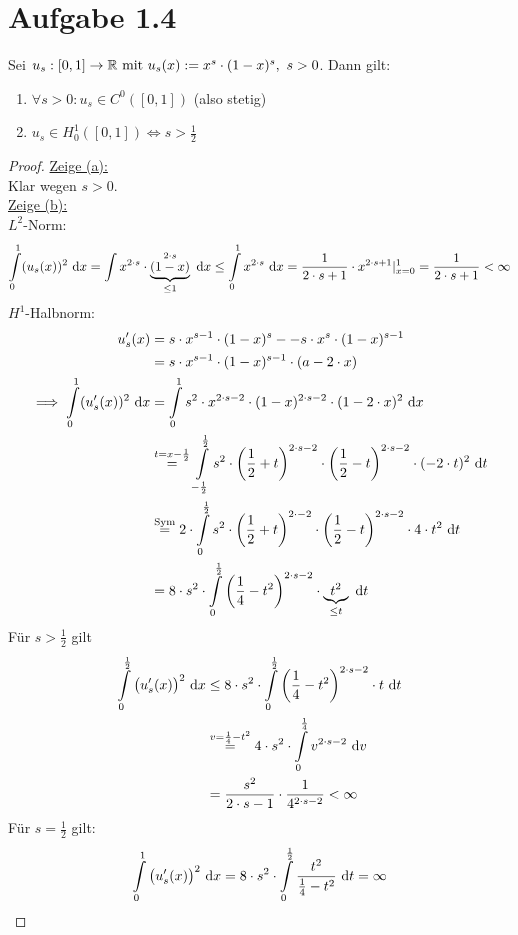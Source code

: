 \documentclass[12pt,a4paper]{article}
\begin{document}
\section*{Aufgabe 1.4}
Sei $u_s:[0,1]\to\mathbb{R}\text{ mit } u_s(x):=x^s\cdot(1-x)^s,~s>0$. Dann gilt:
\begin{enumerate}[label=(\alph*)]
\item $\forall s>0:u_s\in C^0([0,1])$ (also stetig)
\item $u_s\in H_0^1([0,1])\Longleftrightarrow s>\frac{1}{2}$
\end{enumerate}
\begin{proof}
\underline{Zeige (a):}\\
Klar wegen $s>0$.\\

\underline{Zeige (b):}\\
$L^2$-Norm:
\begin{align*}
\int\limits_0^1 (u_s(x))^2\text{ d} x=\int\limits x^{2\cdot s}\cdot\underbrace{(1-x)}_{\leq1}^{2\cdot s}\text{ d} x
\leq\int\limits_0^1 x^{2\cdot s}\text{ d} x
=\frac{1}{2\cdot s+1}\cdot x^{2\cdot s+1}|_{x=0}^1=\frac{1}{2\cdot s+1}<\infty
\end{align*}
$H^1$-Halbnorm:
\begin{align*}
u_s'(x)&=s\cdot x^{s-1}\cdot(1-x)^s--s\cdot x^s\cdot(1-x)^{s-1}\\
&=s\cdot x^{s-1}\cdot(1-x)^{s-1}\cdot(a-2\cdot x)\\
\implies
\int\limits_0^1(u_s'(x))^2\text{ d} x
&=\int\limits_0^1 s^2\cdot x^{2\cdot s-2}\cdot(1-x)^{2\cdot s-2}\cdot (1-2\cdot x)^2\text{ d} x\\
&\stackrel{t=x-\frac{1}{2}}{=}
\int\limits_{-\frac{1}{2}}^{\frac{1}{2}} s^2\cdot\left(\frac{1}{2}+t\right)^{2\cdot s-2}\cdot\left(\frac{1}{2}-t\right)^{2\cdot s-2}\cdot(-2\cdot t)^2\text{ d} t\\
&\stackrel{\text{Sym}}{=} 2\cdot\int\limits_{0}^{\frac{1}{2}}s^2\cdot\left(\frac{1}{2}+t\right)^{2\cdot -2}\cdot\left(\frac{1}{2}-t\right)^{2\cdot s-2}\cdot 4\cdot t^2\text{ d} t\\
&=8\cdot s^2\cdot\int\limits_0^{\frac{1}{2}}\left(\frac{1}{4}-t^2\right)^{2\cdot s-2}\cdot \underbrace{t^2}_{\leq t}\text{ d} t
\end{align*}
Für $s>\frac{1}{2}$ gilt
\begin{align*}
\int\limits_0^{\frac{1}{2}}\big( u_s'(x)\big)^2\text{ d} x
&\leq
8\cdot s^2\cdot\int\limits_0^{\frac{1}{2}}\left(\frac{1}{4}-t^2\right)^{2\cdot s-2}\cdot t\text{ d} t\\
&\stackrel{v=\frac{1}{4}-t^2}{=}
4\cdot s^2\cdot\int\limits_0^{\frac{1}{4}} v^{2\cdot s-2}\text{ d} v\\
&=\frac{s^2}{2\cdot s-1}\cdot\frac{1}{4^{2\cdot s-2}}<\infty
\end{align*}
Für $s=\frac{1}{2}$ gilt:
\begin{align*}
\int\limits_0^1\big(u_s'(x)\big)^2\text{ d} x=8\cdot s^2\cdot\int\limits_0^{\frac{1}{2}}\frac{t^2}{\frac{1}{4}-t^2}\text{ d} t=\infty
\end{align*}


\end{proof}
\end{document}
